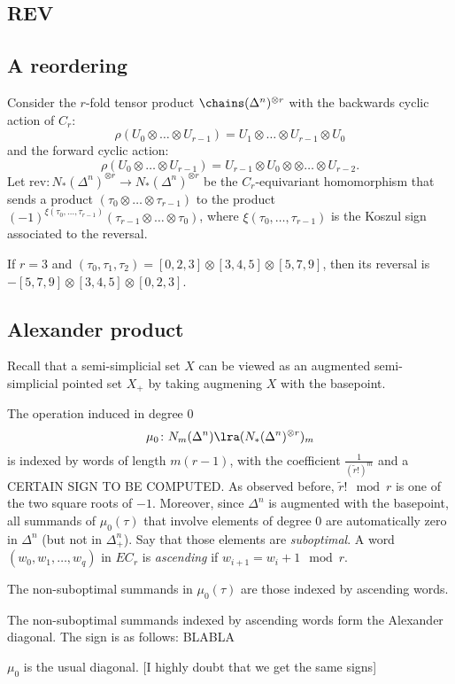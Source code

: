 \subsection{REV} \subsection{A reordering} Consider the $r$-fold tensor product $\chains(\Delta^n)^{\otimes r}$ with the backwards cyclic action of $C_r$:
\[\rho(U_0\otimes \ldots\otimes U_{r-1}) = U_1\otimes \ldots \otimes U_{r-1}\otimes U_0\]
and the forward cyclic action:
\[\rho(U_0\otimes \ldots\otimes U_{r-1}) = U_{r-1}\otimes U_0\otimes \otimes \ldots \otimes U_{r-2}.\]
Let $\mathrm{rev}\colon N_*(\Delta^n)^{\otimes r}\to N_*(\Delta^n)^{\otimes r}$ be the $C_r$-equivariant homomorphism that sends a product $(\tau_0\otimes\ldots\otimes \tau_{r-1})$ to the product $(-1)^{\xi(\tau_{0},\ldots,\tau_{r-1})}(\tau_{r-1}\otimes\ldots\otimes \tau_0)$, where $\xi(\tau_0,\ldots,\tau_{r-1})$ is the Koszul sign associated to the reversal.
\begin{example}\label{ex:101}
    If $r=3$ and $(\tau_0,\tau_1,\tau_2) = [0,2,3]\otimes [3,4,5] \otimes [5,7,9]$, then its reversal is $-[5,7,9]\otimes [3,4,5]\otimes [0,2,3]$.
\end{example}


\subsection{Alexander product} Recall that a semi-simplicial set $X$ can be viewed as an augmented semi-simplicial pointed set $X_+$ by taking augmening $X$ with the basepoint. 

The operation induced in degree $0$
\[\mu_0\colon N_m(\Delta^n)\lra (N_*(\Delta^n)^{\otimes r})_m\]
is indexed by words of length $m(r-1)$, with the coefficient $\frac{1}{(\tilde{r}!)^m}$ and a CERTAIN SIGN TO BE COMPUTED. As observed before, $\tilde{r}!\mod r$ is one of the two square roots of $-1$. Moreover, since $\Delta^n$ is augmented with the basepoint, all summands of $\mu_0(\tau)$ that involve elements of degree $0$ are automatically zero in $\Delta^n$ (but not in $\Delta^n_+$). Say that those elements are \emph{suboptimal}. A word $(w_0,w_1,\ldots,w_q)$ in $EC_r$ is \emph{ascending} if $w_{i+1} = w_i+1\mod r$. 

\begin{proposition}
    The non-suboptimal summands in $\mu_0(\tau)$ are those indexed by ascending words.
\end{proposition}
\begin{proposition}
    The non-suboptimal summands indexed by ascending words form the Alexander diagonal. The sign is as follows: BLABLA 
\end{proposition}
\begin{corollary}
    $\mu_0$ is the usual diagonal. [I highly doubt that we get the same signs]
\end{corollary}




